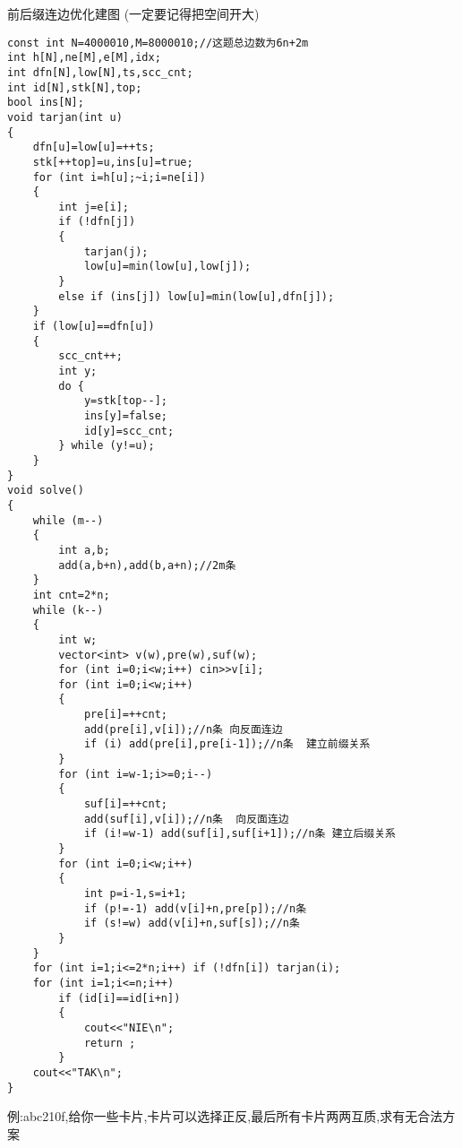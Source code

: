 \documentclass[a4paper]{ctexart}
\begin{document}
前后缀连边优化建图 (一定要记得把空间开大)
\begin{lstlisting}
const int N=4000010,M=8000010;//这题总边数为6n+2m
int h[N],ne[M],e[M],idx;
int dfn[N],low[N],ts,scc_cnt;
int id[N],stk[N],top;
bool ins[N];
void tarjan(int u)
{
    dfn[u]=low[u]=++ts;
    stk[++top]=u,ins[u]=true;
    for (int i=h[u];~i;i=ne[i])
    {
        int j=e[i];
        if (!dfn[j])
        {
            tarjan(j);
            low[u]=min(low[u],low[j]);
        }
        else if (ins[j]) low[u]=min(low[u],dfn[j]);
    }
    if (low[u]==dfn[u])
    {
        scc_cnt++;
        int y;
        do {
            y=stk[top--];
            ins[y]=false;
            id[y]=scc_cnt;
        } while (y!=u);
    }
}
void solve()
{
    while (m--)
    {
        int a,b;
        add(a,b+n),add(b,a+n);//2m条
    }
    int cnt=2*n;
    while (k--)
    {
        int w;
        vector<int> v(w),pre(w),suf(w);
        for (int i=0;i<w;i++) cin>>v[i];
        for (int i=0;i<w;i++)
        {
            pre[i]=++cnt;
            add(pre[i],v[i]);//n条 向反面连边
            if (i) add(pre[i],pre[i-1]);//n条  建立前缀关系
        }
        for (int i=w-1;i>=0;i--)
        {
            suf[i]=++cnt;
            add(suf[i],v[i]);//n条  向反面连边
            if (i!=w-1) add(suf[i],suf[i+1]);//n条 建立后缀关系
        }
        for (int i=0;i<w;i++)
        {
            int p=i-1,s=i+1;
            if (p!=-1) add(v[i]+n,pre[p]);//n条
            if (s!=w) add(v[i]+n,suf[s]);//n条
        }
    }
    for (int i=1;i<=2*n;i++) if (!dfn[i]) tarjan(i);
    for (int i=1;i<=n;i++)
        if (id[i]==id[i+n])
        {
            cout<<"NIE\n";
            return ;
        }
    cout<<"TAK\n";
}
\end{lstlisting}

例:abc210f,给你一些卡片,卡片可以选择正反,最后所有卡片两两互质,求有无合法方案
\end{document}

